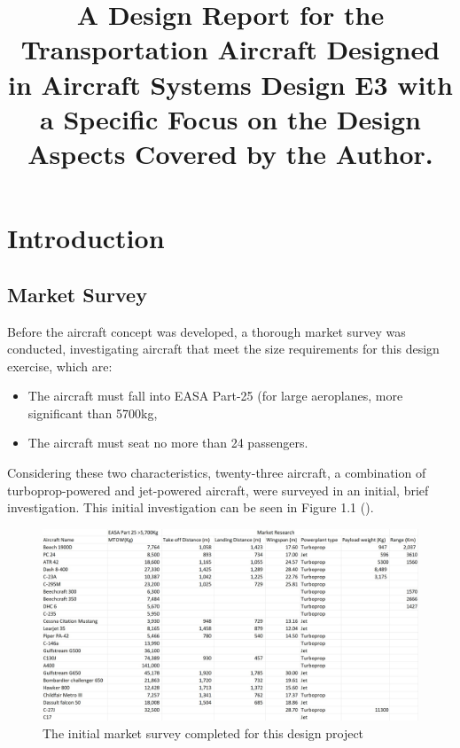 \documentclass[stu, a4paper, 12pt, floatsintext]{apa7}
\title{A Design Report for the Transportation Aircraft Designed in Aircraft Systems Design E3 with a Specific Focus on the Design Aspects Covered by the Author.}
\numberwithin{figure}{section}
\numberwithin{table}{section}
\numberwithin{equation}{section}
\begin{document}
\maketitle{} %

\tableofcontents

\newpage

\listoffigures
{}
\listoftables
{}
\listofmyequations

\newpage

\section{Introduction}
\subsection{Market Survey}
Before the aircraft concept was developed, a thorough market survey was conducted, investigating aircraft that meet the size requirements for this design exercise, which are:
\begin{itemize}
    \item The aircraft must fall into EASA Part-25 (for large aeroplanes, more significant than 5700kg,
    \item The aircraft must seat no more than 24 passengers.     
\end{itemize}
Considering these two characteristics, twenty-three aircraft, a combination of turboprop-powered and jet-powered aircraft, were surveyed in an initial, brief investigation. This initial investigation can be seen in Figure 1.1 (\cite{janes2023}). 

\begin{figure}[H]
    \caption{The initial market survey completed for this design project}
    \label{fig:market_survey_initial}
    \centering
    \includegraphics[width=1.1\textwidth]{pictures/market_survey_initial.jpg}
\end{figure}
\end{document}
